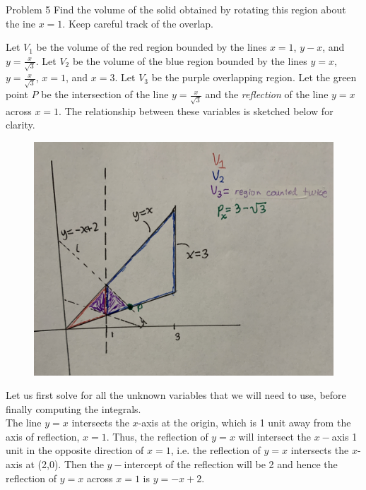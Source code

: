 \documentclass{article}
\begin{document}
    \pagebreak

    \begin{tbhtheorem}{Problem 5}
        Find the volume of the solid obtained by rotating this region about the ine $x=1$. Keep careful track of the overlap.
    \end{tbhtheorem}

    Let $V_1$ be the volume of the red region bounded by the lines $x=1$, $y-x$, and $y=\frac{x}{\sqrt{3}}$. Let $V_2$ be the volume of the blue region bounded by the lines $y=x$, $y=\frac{x}{\sqrt{3}}$, $x=1$, and $x=3$.
    Let $V_3$ be the purple overlapping region. Let the green point $P$ be the intersection of the line $y=\frac{x}{\sqrt{3}}$ and the \textit{reflection} of the line $y=x$ across $x=1$. The relationship between these
    variables is sketched below for clarity.
    
    \begin{figure}[hbt!]
        \centering
        \includegraphics[scale=0.1]{volume}
    \end{figure}

    Let us first solve for all the unknown variables that we will need to use, before finally computing the integrals. \\

    The line $y=x$ intersects the $x$-axis at the origin, which is 1 unit away from the axis of reflection, $x=1$. Thus, the reflection of $y=x$ will intersect the $x-$axis 1 unit in the opposite direction of $x=1$,
    i.e. the reflection of $y=x$ intersects the $x$-axis at (2,0). Then the $y-$intercept of the reflection will be 2 and hence the reflection of $y=x$ across $x=1$ is $y=-x+2$. \\
\end{document}
